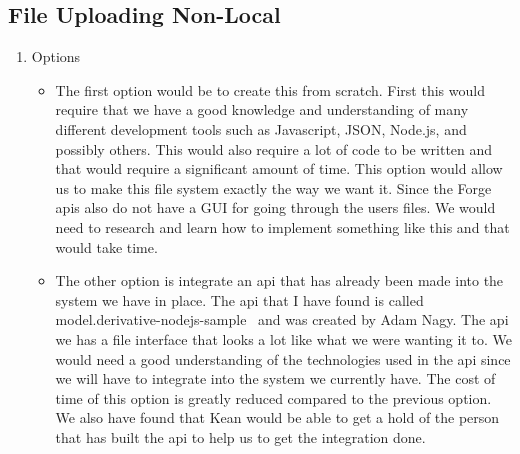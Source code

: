 \documentclass[letterpaper, 10pt, draftclsnofoot, compsoc, onecolumn]{IEEEtran}
\begin{document}
	\subsection{File Uploading Non-Local}
		\begin{enumerate}
			\item{Options}
				\begin{itemize}
					\item  The first option would be to create this from scratch. First this would require that we have a good knowledge and understanding of many different
						development tools such as Javascript, JSON, Node.js, and possibly others. This would also require a lot of code to be written and that would require
						a significant amount of time. This option would allow us to make this file system exactly the way we want it. Since the Forge apis also do not have a 
						GUI for going through the users files. We would need to research and learn how to implement something like this and that would take time. 
 
					\item  The other option is integrate an api that has already been made into the system we have in place. The api that I have found is called model.derivative-nodejs-sample~\cite{fileUpload2017}
						and was created by Adam Nagy.  The api we has a file interface that looks a lot like what we were wanting it to. We would need a good understanding of the technologies used in the api since we 
						will have to integrate into the system we currently have. The cost of time of this option is greatly reduced compared to the previous option. We also have found that Kean would be able to 
						get a hold of the person that has built the api to help us to get the integration done.


\end{itemize}
\end{enumerate}
\end{document}
